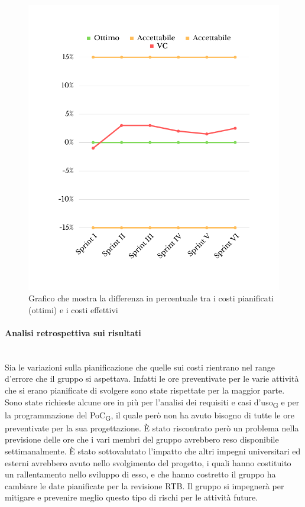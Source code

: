 \begin{figure}[H]
	\centering
	\includegraphics[scale=0.5]{img/CV.png}
	\caption{Grafico che mostra la differenza in percentuale tra i costi pianificati (ottimi) e i costi effettivi}
\end{figure}
\paragraph{Analisi retrospettiva sui risultati}\mbox{}\\
Sia le variazioni sulla pianificazione che quelle sui costi rientrano nel range d'errore che il gruppo si aspettava. Infatti le ore preventivate per le varie attività che si erano pianificate di svolgere sono state rispettate per la maggior parte. Sono state richieste alcune ore in più per l'analisi dei requisiti e casi d'uso\textsubscript{G} e per la programmazione del PoC\textsubscript{G}, il quale però non ha avuto bisogno di tutte le ore preventivate per la sua progettazione. È stato riscontrato però un problema nella previsione delle ore che i vari membri del gruppo avrebbero reso disponibile settimanalmente. È stato sottovalutato l'impatto che altri impegni universitari ed esterni avrebbero avuto nello svolgimento del progetto, i quali hanno costituito un rallentamento nello sviluppo di esso, e che hanno costretto il gruppo ha cambiare le date pianificate per la revisione RTB. Il gruppo si impegnerà per mitigare e prevenire meglio questo tipo di rischi per le attività future.
